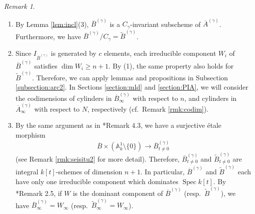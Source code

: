 \documentclass[a4paper,11pt]{amsart}
\theoremstyle{definition}
\theoremstyle{remark}
\newtheorem{rmk}[thm]{Remark}
\begin{document}
\begin{rmk}\label{rmk:seisitu}
\begin{enumerate}
\item 
By Lemma \ref{lem:incl}(3), $\overline{B}^{(\gamma)}$ is a $C_{\gamma}$-invariant subscheme of $\overline{A}^{(\gamma)}$. 
Furthermore, we have $\overline{B}^{(\gamma)} / C_{\gamma} = \widetilde{B}^{(\gamma)}$. 

\item 
Since $I _{\overline{B}^{(\gamma)}}$ is generated by $c$ elements, 
each irreducible component $W_i$ of $\overline{B}^{(\gamma)}$ satisfies $\dim W_i \ge n+1$. 
By (1), the same property also holds for $\widetilde{B}^{(\gamma)}$. 
Therefore, we can apply lemmas and propositions in Subsection \ref{subsection:arc2}. 
In Sections \ref{section:mld} and \ref{section:PIA}, we will consider the codimensions of cylinders in $\overline{B}^{(\gamma)} _{\infty}$ with respect to $n$, and cylinders in $\overline{A}^{(\gamma)} _{\infty}$ with respect to $N$, respectively (cf.\ Remark \ref{rmk:codim}). 

\item 
By the same argument as in \cite{NS22}*{Remark 4.3}, we have a surjective \'{e}tale morphism
\[
\overline{B} \times \left( \mathbb{A}^1 _k \setminus \{ 0 \} \right)
\to \overline{B}^{(\gamma)}_{t \not = 0}
\]
(see Remark \ref{rmk:seisitu2} for more detail). 
Therefore, $\overline{B}^{(\gamma)}_{t \not = 0}$ and $\widetilde{B}^{(\gamma)}_{t \not = 0}$ are integral $k[t]$-schemes of dimension $n+1$. 
In particular, $\overline{B}^{(\gamma)}$ and $\widetilde{B}^{(\gamma)}$ each have only one irreducible component which dominates $\operatorname{Spec} k[t]$. 
By \cite{NS22}*{Remark 2.5}, if $W$ is the dominant component of $\overline{B}^{(\gamma)}$ (resp.\ $\widetilde{B}^{(\gamma)}$), we have $\overline{B}^{(\gamma)} _{\infty} = W_{\infty}$ (resp.\ $\widetilde{B}^{(\gamma)} _{\infty} = W_{\infty}$). 
\end{enumerate}
\end{rmk}
\end{document}
